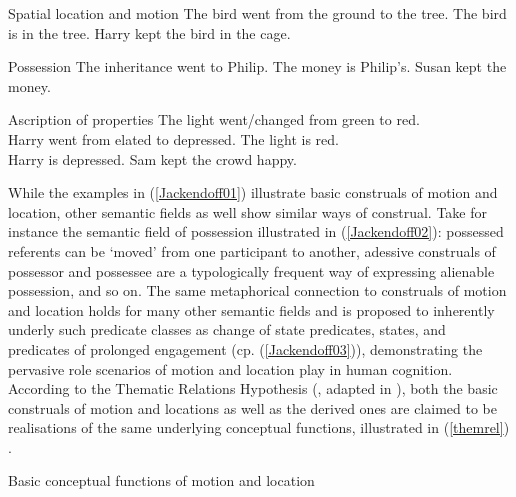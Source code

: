 \ea \label{Jackendoff01} Spatial location and motion
\ea  The bird went from the ground to the tree.
\ex The bird is in the tree.
\ex Harry kept the bird in the cage.
\z
\z

\ea \label{Jackendoff02} Possession
\ea The inheritance went to Philip.
\ex The money is Philip's.
\ex Susan kept the money.
\z
\z

\ea \label{Jackendoff03} Ascription of properties
\ea The light went/changed from green to red. \\
Harry went from elated to depressed.
\ex The light is red. \\
Harry is depressed.
\ex Sam kept the crowd happy.
\z
\z

While the examples in (\ref{Jackendoff01}) illustrate basic construals of motion and location, other semantic fields as well show similar ways of construal. Take for instance the semantic field of possession illustrated in (\ref{Jackendoff02}): possessed referents can be `moved' from one participant to another, adessive construals of possessor and possessee are a typologically frequent way of expressing alienable possession, and so on. The same metaphorical connection to construals of motion and location holds for many other semantic fields and is proposed to inherently underly such predicate classes as change of state predicates, states, and predicates of prolonged engagement (cp. (\ref{Jackendoff03})), demonstrating the pervasive role scenarios of motion and location play in human cognition. According to the Thematic Relations Hypothesis (\citealt{gruber1965studies}, adapted in \citealt{Jackendoff1990}), both the basic construals of motion and locations as well as the derived ones are claimed to be realisations of the same underlying conceptual functions, illustrated in (\ref{themrel}) \citep[26]{Jackendoff1990}.

\ea \label{themrel}
Basic conceptual functions of motion and location
\z

\avmsortfont{\itshape}
{\scriptsize
\begin{avm}
\end{avm}
}

\smallskip
{\scriptsize
\begin{avm}
\end{avm}
}

